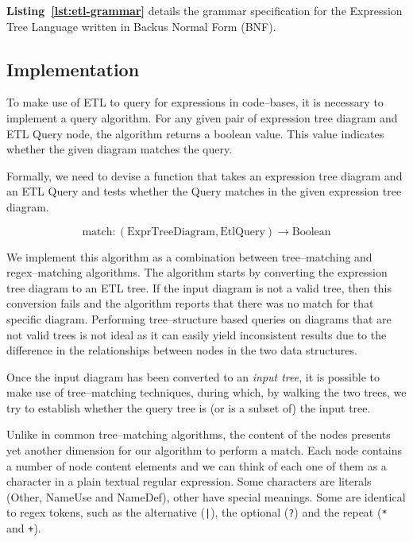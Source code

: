 \begin{chapterBody}
\textbf{Listing~\ref{lst:etl-grammar}} details the grammar specification
for the Expression Tree Language written in Backus Normal Form (BNF).

\subsection{Implementation}\label{sec:etl-impl}

To make use of ETL to query for expressions in code–bases, it is necessary to
implement a query algorithm. For any given pair of expression tree diagram
and ETL Query node, the algorithm returns a boolean value. This value
indicates whether the given diagram matches the query.

Formally, we need to devise a function that takes an expression tree diagram
and an ETL Query and tests whether the Query matches in the given expression
tree diagram.

\[
\text{match}:
\left( \text{ExprTreeDiagram}, \text{EtlQuery}\right)
\rightarrow
\text{Boolean}
\]

We implement this algorithm as a combination between tree–matching and
regex–matching algorithms.
The algorithm starts by converting the expression tree diagram to an ETL tree.
If the input diagram is not a valid tree, then this conversion fails and
the algorithm reports that there was no match for that specific diagram.
Performing tree–structure based queries on diagrams that are not valid trees
is not ideal as it can easily yield inconsistent results due to the difference
in the relationships between nodes in the two data structures.

Once the input diagram has been converted to an \textit{input tree}, it is
possible to make use of tree–matching techniques, during which, by walking the
two trees, we try to establish whether the query tree is (or is a subset of)
the input tree.

Unlike in common tree–matching algorithms, the content of the nodes presents
yet another dimension for our algorithm to perform a match. Each node contains
a number of node content elements and we can think of each one of them as a
character in a plain textual regular expression. Some characters are literals
(Other, NameUse and NameDef), other have special meanings. Some are identical
to regex tokens, such as the alternative (\texttt{|}), the optional
(\texttt{?}) and the repeat (\texttt{*} and \texttt{+}).


\end{chapterBody}
